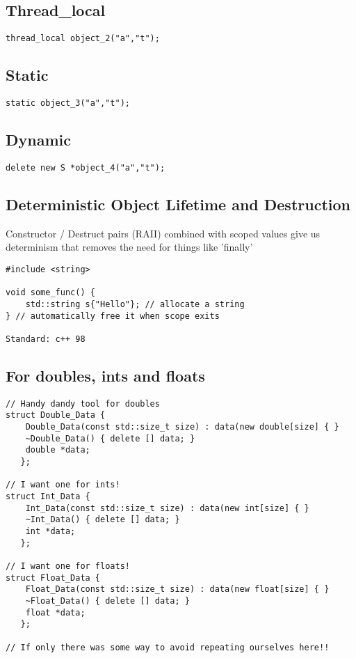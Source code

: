 \documentclass[openany]{report}
\begin{document}
\subsection{Thread\_local}
\begin{verbatim}
thread_local object_2("a","t");
\end{verbatim}
\subsection{Static}
\begin{verbatim}
static object_3("a","t");
\end{verbatim}
\subsection{Dynamic}
\begin{verbatim}
delete new S *object_4("a","t");
\end{verbatim}

\subsection{Deterministic Object Lifetime and Destruction}

Constructor / Destruct pairs (RAII) combined with scoped values give us determinism that removes the need for things like 'finally'

\begin{verbatim}
#include <string>

void some_func() {
    std::string s{"Hello"}; // allocate a string
} // automatically free it when scope exits

Standard: c++ 98
\end{verbatim}

\subsection{For doubles, ints and floats}

\begin{verbatim}
// Handy dandy tool for doubles
struct Double_Data {
    Double_Data(const std::size_t size) : data(new double[size] { }
    ~Double_Data() { delete [] data; }
    double *data;
   };

// I want one for ints!
struct Int_Data {
    Int_Data(const std::size_t size) : data(new int[size] { }
    ~Int_Data() { delete [] data; }
    int *data;
   };

// I want one for floats!
struct Float_Data {
    Float_Data(const std::size_t size) : data(new float[size] { }
    ~Float_Data() { delete [] data; }
    float *data;
   };

// If only there was some way to avoid repeating ourselves here!!
\end{verbatim}
\end{document}
